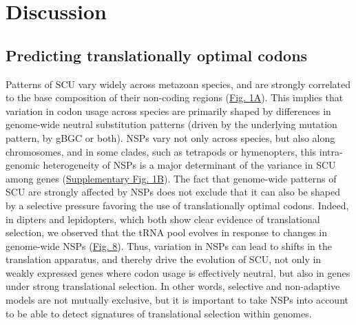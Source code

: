 \section{Discussion}

\subsection{Predicting translationally optimal codons}

Patterns of SCU vary widely across metazoan species, and are strongly correlated to the base composition of their non-coding regions (\hyperref[fig:CU1]{Fig. 1A}). This implies that variation in codon usage across species are primarily shaped by differences in genome-wide neutral substitution patterns (driven by the underlying mutation pattern, by gBGC or both). NSPs vary not only across species, but also along chromosomes, and in some clades, such as tetrapods or hymenopters, this intra-genomic heterogeneity of NSPs is a major determinant of the variance in SCU among genes (\hyperref[suppfig:CU1]{Supplementary Fig. 1B}). The fact that genome-wide patterns of SCU are strongly affected by NSPs does not exclude that it can also be shaped by a selective pressure favoring the use of translationally optimal codons. Indeed, in dipters and lepidopters, which both show clear evidence of translational selection, we observed that the tRNA pool evolves in response to changes in genome-wide NSPs (\hyperref[fig:CU8]{Fig. 8}). Thus, variation in NSPs can lead to shifts in the translation apparatus, and thereby drive the evolution of SCU, not only in weakly expressed genes where codon usage is effectively neutral, but also in genes under strong translational selection. In other words, selective and non-adaptive models are not mutually exclusive, but it is important to take NSPs into account to be able to detect signatures of translational selection within genomes.

